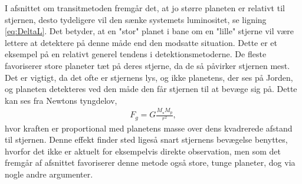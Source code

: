 I afsnittet om transitmetoden fremgår det, at jo større planeten er relativt til stjernen, desto tydeligere vil den sænke systemets luminositet, se ligning \ref{eq:DeltaL}. Det betyder, at en "stor" planet i bane om en "lille" stjerne vil være lettere at detektere på denne måde end den modsatte situation. Dette er et eksempel på en relativt generel tendens i detektionsmetoderne. De fleste favoriserer store planeter tæt på deres stjerne, da de så påvirker stjernen mest. Det er vigtigt, da det ofte er stjernens lys, og ikke planetens, der ses på Jorden, og planeten detekteres ved den måde den får stjernen til at bevæge sig på. Dette kan ses fra Newtons tyngdelov,
\begin{align} \label{eq:FgNewton}
    F_g = G \frac{M_\star M_p}{r^2},
\end{align}
hvor kraften er proportional med planetens masse over dens kvadrerede afstand til stjernen. Denne effekt finder sted ligeså snart stjernens bevægelse benyttes, hvorfor det ikke er aktuelt for eksempelvis direkte observation, men som det fremgår af afsnittet favoriserer denne metode også store, tunge planeter, dog via nogle andre argumenter. \\

